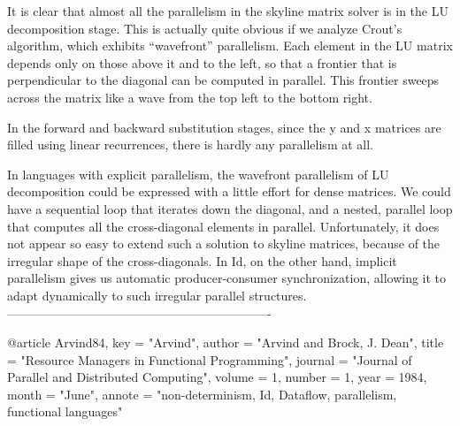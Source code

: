 \begin{figure}[htbp]
 \end{figure}

 \begin{figure}[htbp]
 \end{figure}

It is clear that almost all the parallelism in the skyline matrix
solver is in the LU decomposition stage.  This is actually quite
obvious if we analyze Crout's algorithm, which exhibits ``wavefront''
parallelism.  Each element in the LU matrix depends only on those
above it and to the left, so that a frontier that is perpendicular to
the diagonal can be computed in parallel.  This frontier sweeps across
the matrix like a wave from the top left to the bottom right.

In the forward and backward substitution stages, since the {\cf y} and
{\cf x} matrices are filled using linear recurrences, there is hardly
any parallelism at all.

In languages with explicit parallelism, the wavefront parallelism of
LU decomposition could be expressed with a little effort for dense
matrices. We could have a sequential loop that iterates down the
diagonal, and a nested, parallel loop that computes all the
cross-diagonal elements in parallel.  Unfortunately, it does not
appear so easy to extend such a solution to skyline matrices, because
of the irregular shape of the cross-diagonals.  In Id, on the other
hand, implicit parallelism gives us automatic producer-consumer
synchronization, allowing it to adapt dynamically to such irregular
parallel structures.
----------------------------------------------------------------

@article{
    Arvind84,
    key = "Arvind",
    author = "Arvind and Brock, J. Dean",
    title = "{Resource Managers in Functional Programming}",
    journal = "Journal of Parallel and Distributed Computing",
    volume = 1,
    number = 1,
    year = 1984,
    month = "June",
    annote = "non-determinism,  Id, Dataflow, parallelism, functional languages"
}

